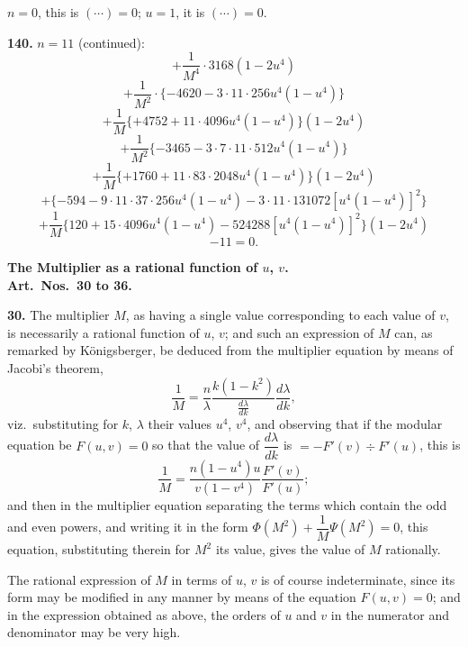 \documentclass[11pt,a4paper]{book}
\begin{document}
$n = 0$, this is $(\cdots) = 0$; $u = 1$, it is $(\cdots) = 0$.


\noindent\textbf{140.} $n = 11$ (continued):
\[
+ \frac{1}{M^4} \cdot 3168(1 - 2u^4)
\]
\[
+ \frac{1}{M^2} \cdot \{-4620 - 3 \cdot 11 \cdot 256u^4(1 - u^4)\}
\]
\[
+ \frac{1}{M}\{+4752 + 11 \cdot 4096u^4(1 - u^4)\}(1 - 2u^4)
\]
\[
+ \frac{1}{M^2}\{-3465 - 3 \cdot 7 \cdot 11 \cdot 512u^4(1 - u^4)\}
\]
\[
+ \frac{1}{M}\{+1760 + 11 \cdot 83 \cdot 2048u^4(1 - u^4)\}(1 - 2u^4)
\]
\[
+ \{-594 - 9 \cdot 11 \cdot 37 \cdot 256u^4(1 - u^4) - 3 \cdot 11 \cdot 131072[u^4(1 - u^4)]^2\}
\]
\[
+ \frac{1}{M}\{120 + 15 \cdot 4096u^4(1 - u^4) - 524288[u^4(1 - u^4)]^2\}(1 - 2u^4)
\]
\[
- 11 = 0.
\]

\medskip
\noindent\textbf{The Multiplier as a rational function of $u$, $v$.}\\
\textbf{Art.~Nos.~30 to 36.}

\medskip
\noindent\textbf{30.} The multiplier $M$, as having a single value corresponding to each value of $v$, is necessarily a rational function of $u$, $v$; and such an expression of $M$ can, as remarked by K\"onigsberger, be deduced from the multiplier equation by means of Jacobi's theorem,
\[
\frac{1}{M} = \frac{n}{\lambda}\frac{k(1 - k^2)}{\frac{d\lambda}{dk}}\frac{d\lambda}{dk},
\]
viz.\ substituting for $k$, $\lambda$ their values $u^4$, $v^4$, and observing that if the modular equation be $F(u, v) = 0$ so that the value of $\dfrac{d\lambda}{dk}$ is $= -F'(v) \div F'(u)$, this is
\[
\frac{1}{M} = \frac{n(1 - u^4)u}{v(1 - v^4)}\frac{F'(v)}{F'(u)};
\]
and then in the multiplier equation separating the terms which contain the odd and even powers, and writing it in the form $\Phi(M^2) + \dfrac{1}{M}\Psi(M^2) = 0$, this equation, substituting therein for $M^2$ its value, gives the value of $M$ rationally.

The rational expression of $M$ in terms of $u$, $v$ is of course indeterminate, since its form may be modified in any manner by means of the equation $F(u, v) = 0$; and in the expression obtained as above, the orders of $u$ and $v$ in the numerator and denominator may be very high.
\end{document}
